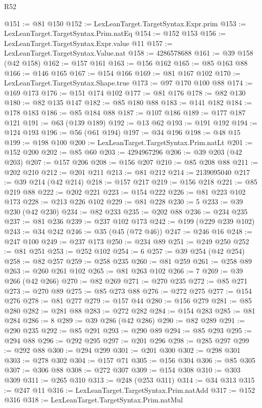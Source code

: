 \begin{lexlean}{R52}
\begin{coremodule}
@151 := @81 @150
@152 := LexLeanTarget.TargetSyntax.Expr.prim
@153 := LexLeanTarget.TargetSyntax.Prim.natEq
@154 := @152 @153
@156 := LexLeanTarget.TargetSyntax.Expr.value @11
@157 := LexLeanTarget.TargetSyntax.Value.nat
@158 := 4286578688
@161 := @39 @158 (@42 @158)
@162 := @157 @161
@163 := @156 @162
@165 := @85 @163 @88
@166 := @146 @165
@167 := @154 @166
@169 := @81 @167 @102
@170 := LexLeanTarget.TargetSyntax.Shape.true
@173 := @97 @170 @100 @88
@174 := @169 @173
@176 := @151 @174 @102
@177 := @81 @176
@178 := @82 @130
@180 := @82 @135 @147
@182 := @85 @180 @88
@183 := @141 @182
@184 := @178 @183
@186 := @85 @184 @88
@187 := @107 @186
@189 := @177 @187 @121
@191 := @63 (@139 @189)
@192 := @13 @62
@193 := @191 @192
@194 := @124 @193
@196 := @56 (@61 @194)
@197 := @34 @196
@198 := @48 @15
@199 := @198 @100
@200 := LexLeanTarget.TargetSyntax.Prim.natLt
@201 := @152 @200
@202 := @85 @60
@203 := 4294967296
@206 := @39 @203 (@42 @203)
@207 := @157 @206
@208 := @156 @207
@210 := @85 @208 @88
@211 := @202 @210
@212 := @201 @211
@213 := @81 @212
@214 := 2139095040
@217 := @39 @214 (@42 @214)
@218 := @157 @217
@219 := @156 @218
@221 := @85 @219 @88
@222 := @202 @221
@223 := @154 @222
@226 := @81 @223 @102 @173
@228 := @213 @226 @102
@229 := @81 @228
@230 := 5
@233 := @39 @230 (@42 @230)
@234 := @82 @233
@235 := @202 @88
@236 := @234 @235
@237 := @81 @236
@239 := @237 @102 @173
@242 := @199 (@229 @239 @102)
@243 := @34 @242
@246 := @35 (@45 (@72 @46))
@247 := @246 @16
@248 := @247 @100
@249 := @237 @173
@250 := @234 @89
@251 := @249 @250
@252 := @81 @251
@253 := @252 @102
@254 := 6
@257 := @39 @254 (@42 @254)
@258 := @82 @257
@259 := @258 @235
@260 := @81 @259
@261 := @258 @89
@263 := @260 @261 @102
@265 := @81 @263 @102
@266 := 7
@269 := @39 @266 (@42 @266)
@270 := @82 @269
@271 := @270 @235
@272 := @85 @271
@273 := @270 @89
@275 := @85 @273 @88
@276 := @272 @275
@277 := @154 @276
@278 := @81 @277
@279 := @157 @44
@280 := @156 @279
@281 := @85 @280
@282 := @281 @88
@283 := @272 @282
@284 := @154 @283
@285 := @81 @284
@286 := 8
@289 := @39 @286 (@42 @286)
@290 := @82 @289
@291 := @290 @235
@292 := @85 @291
@293 := @290 @89
@294 := @85 @293
@295 := @294 @88
@296 := @292 @295
@297 := @201 @296
@298 := @285 @297
@299 := @292 @88
@300 := @294 @299
@301 := @201 @300
@302 := @298 @301
@303 := @278 @302
@304 := @157 @71
@305 := @156 @304
@306 := @85 @305
@307 := @306 @88
@308 := @272 @307
@309 := @154 @308
@310 := @303 @309
@311 := @265 @310
@313 := @248 (@253 @311)
@314 := @34 @313
@315 := @247 @11
@316 := LexLeanTarget.TargetSyntax.Prim.natAdd
@317 := @152 @316
@318 := LexLeanTarget.TargetSyntax.Prim.natMul

\end{coremodule}
\end{lexlean}
